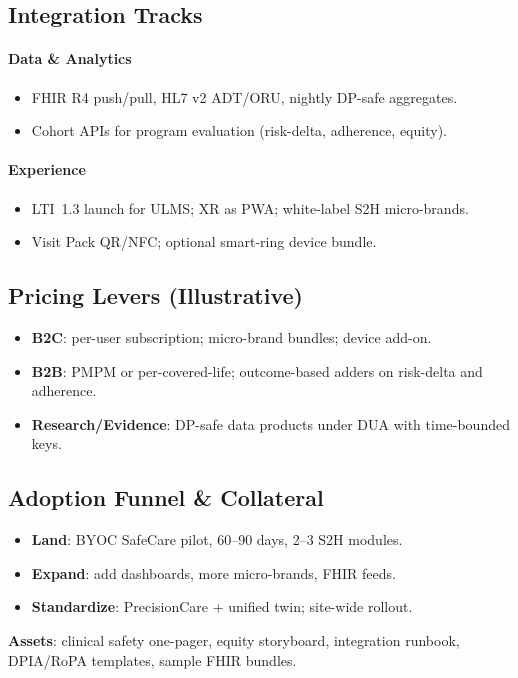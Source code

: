 \documentclass[11pt]{article}
\theoremstyle{plain}
\begin{document}
\subsection{Integration Tracks}
\paragraph{Data \& Analytics}
\begin{itemize}
  \item FHIR R4 push/pull, HL7 v2 ADT/ORU, nightly DP-safe aggregates.
  \item Cohort APIs for program evaluation (risk-delta, adherence, equity).
\end{itemize}
\paragraph{Experience}
\begin{itemize}
  \item LTI~1.3 launch for ULMS; XR as PWA; white-label S2H micro-brands.
  \item Visit Pack QR/NFC; optional smart-ring device bundle.
\end{itemize}

\subsection{Pricing Levers (Illustrative)}
\begin{itemize}
  \item \textbf{B2C}: per-user subscription; micro-brand bundles; device add-on.
  \item \textbf{B2B}: PMPM or per-covered-life; outcome-based adders on risk-delta and adherence.
  \item \textbf{Research/Evidence}: DP-safe data products under DUA with time-bounded keys.
\end{itemize}

\subsection{Adoption Funnel \& Collateral}
\begin{itemize}
  \item \textbf{Land}: BYOC SafeCare pilot, 60–90 days, 2–3 S2H modules.
  \item \textbf{Expand}: add dashboards, more micro-brands, FHIR feeds.
  \item \textbf{Standardize}: PrecisionCare + unified twin; site-wide rollout.
\end{itemize}
\textbf{Assets}: clinical safety one-pager, equity storyboard, integration runbook, DPIA/RoPA templates, sample FHIR bundles.
\end{document}

